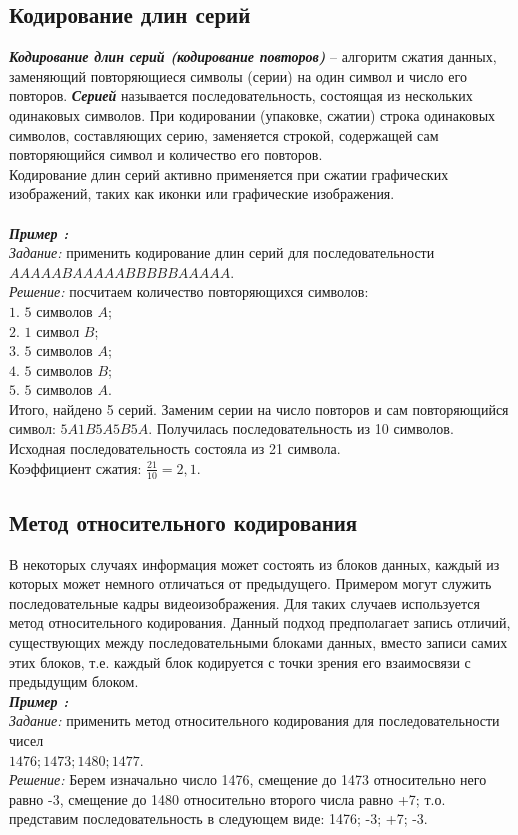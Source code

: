 \subsection{Кодирование длин серий}
\emph{\textbf{Кодирование длин серий (кодирование повторов)}} -- алгоритм сжатия данных, заменяющий повторяющиеся символы (серии) на один символ и число его повторов. \emph{\textbf{Серией}} называется последовательность, состоящая из нескольких одинаковых символов. При кодировании (упаковке, сжатии) строка одинаковых символов, составляющих серию, заменяется строкой, содержащей сам повторяющийся символ и количество его повторов.
\\Кодирование длин серий активно применяется при сжатии графических изображений, таких как иконки или графические изображения.
\\
\\\emph{\textbf{Пример :}}
\\\emph{Задание:} применить кодирование длин серий для последовательности \\$AAAAABAAAAABBBBBAAAAA$.
\\\emph{Решение:} посчитаем количество повторяющихся символов:
\\$1.$ $5$ символов $A$;
\\$2.$ $1$ символ $B$;
\\$3.$ $5$ символов $A$;
\\$4.$ $5$ символов $B$;
\\$5.$ $5$ символов $A$.
\\Итого, найдено 5 серий. Заменим серии на число повторов и сам повторяющийся символ: $5A1B5A5B5A$. Получилась последовательность из 10 символов. Исходная последовательность состояла из 21 символа.
\\Коэффициент сжатия: $\frac{21}{10} = 2,1$.

\subsection{Метод относительного кодирования}
В некоторых случаях информация может состоять из блоков данных, каждый из которых может немного отличаться от предыдущего. Примером могут служить последовательные кадры видеоизображения. Для таких случаев используется метод относительного кодирования. Данный подход предполагает запись отличий, существующих между последовательными блоками данных, вместо записи самих этих блоков, т.е. каждый блок кодируется с точки зрения его взаимосвязи с предыдущим блоком. 
\\\emph{\textbf{Пример :}}
\\\emph{Задание:} применить метод относительного кодирования для последовательности чисел \\$1476; 1473; 1480; 1477$.
\\\emph{Решение:} Берем изначально число 1476, смещение до 1473 относительно него равно -3, смещение до 1480 относительно второго числа равно +7; т.о. представим последовательность в следующем виде: 1476; -3; +7; -3.

